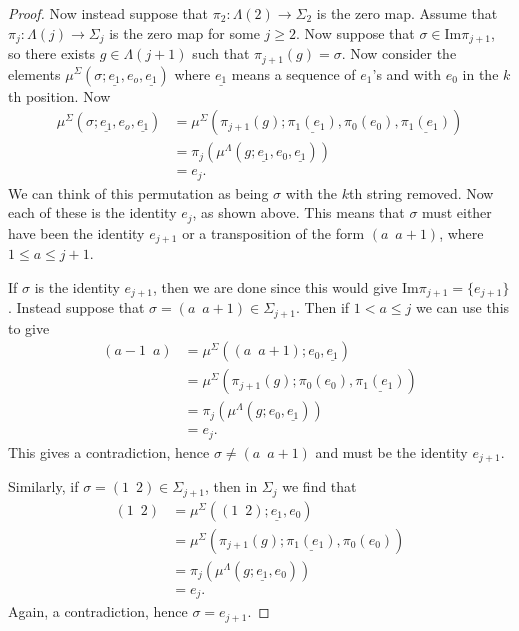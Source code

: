 \documentclass{amsbook} %
\numberwithin{section}{chapter}
\begin{document}
\begin{proof}
Now instead suppose that $\pi_2 \colon \Lambda(2) \rightarrow \Sigma_2$ is the zero map. Assume that $\pi_j \colon \Lambda(j) \rightarrow \Sigma_j$ is the zero map for some $j \geq 2$. Now suppose that $\sigma \in \textrm{Im}\pi_{j+1}$, so there exists $g \in \Lambda(j+1)$ such that $\pi_{j+1}(g) = \sigma$. Now consider the elements $\mu^\Sigma(\sigma; \underline{e_1}, e_o, \underline{e_1})$ where $\underline{e_1}$ means a sequence of $e_1$'s and with $e_0$ in the $k$th position. Now
  \begin{align*}
    \mu^\Sigma(\sigma; \underline{e_1}, e_o, \underline{e_1}) &= \mu^\Sigma(\pi_{j+1}(g); \underline{\pi_1(e_1)}, \pi_0(e_0), \underline{\pi_1(e_1)}) \\
    &= \pi_j(\mu^\Lambda(g; \underline{e_1}, e_0, \underline{e_1})) \\
    &= e_j.
  \end{align*}
We can think of this permutation as being $\sigma$ with the $k$th string removed. Now each of these is the identity $e_j$, as shown above. This means that $\sigma$ must either have been the identity $e_{j+1}$ or a transposition of the form $(a \,\,\, a + 1)$, where $1 \leq a \leq j + 1$.

If $\sigma$ is the identity $e_{j+1}$, then we are done since this would give $\textrm{Im}\pi_{j+1} = \{e_{j+1}\}$. Instead suppose that $\sigma = (a \,\,\, a + 1) \in \Sigma_{j + 1}$. Then if $1 < a \leq j$ we can use this to give
  \begin{align*}
    (a -1 \,\,\, a) &= \mu^\Sigma((a \,\,\, a + 1); e_0, \underline{e_1}) \\
    &= \mu^\Sigma(\pi_{j+1}(g);\pi_0(e_0), \underline{\pi_1(e_1)}) \\
    &= \pi_j(\mu^\Lambda(g; e_0, \underline{e_1})) \\
    &= e_j.
  \end{align*}
This gives a contradiction, hence $\sigma \neq (a \,\,\, a + 1)$ and must be the identity $e_{j+1}$.

Similarly, if $\sigma = (1 \,\,\, 2) \in \Sigma_{j+1}$, then in $\Sigma_j$ we find that
  \begin{align*}
    (1 \,\,\, 2) &= \mu^\Sigma((1 \,\,\, 2) ; \underline{e_1}, e_0) \\
    &= \mu^\Sigma(\pi_{j+1}(g); \underline{\pi_1(e_1)}, \pi_0(e_0)) \\
    &= \pi_j(\mu^\Lambda(g ; \underline{e_1}, e_0)) \\
    &= e_j.
  \end{align*}
Again, a contradiction, hence $\sigma = e_{j+1}$.
\end{proof}
\end{document}
